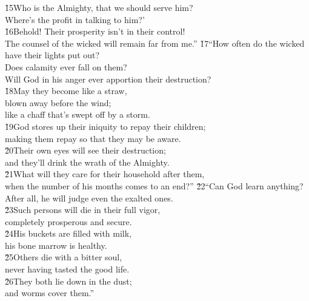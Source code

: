 \begin{poetry}
\poeml \v{15}Who is the Almighty, that we should serve him? \\
\poemll    Where's the profit in talking to him?' \\
\poeml \v{16}Behold! Their prosperity isn't in their control! \\
\poemll    The counsel of the wicked will remain far from me.''
\poeml \v{17}``How often do the wicked have their lights put out? \\
\poemll    Does calamity ever fall on them? \\
\poemlll       Will God in his anger ever apportion their destruction? \\
\poeml \v{18}May they become like a straw, \\
\poemll    blown away before the wind; \\
\poemlll       like a chaff that's swept off by a storm. \\
\poeml \v{19}God stores up their iniquity to repay their children; \\
\poemll    making them repay so that they may be aware. \\
\poeml \v{20}Their own eyes will see their destruction; \\
\poemll    and they'll drink the wrath of the Almighty. \\
\poeml \v{21}What will they care for their household after them, \\
\poemll    when the number of his months comes to an end?''
\poeml \v{22}``Can God learn anything? \\
\poemll    After all, he will judge even the exalted ones. \\
\poeml \v{23}Such persons will die in their full vigor, \\
\poemll    completely prosperous and secure. \\
\poeml \v{24}His buckets are filled with milk, \\
\poemll    his bone marrow is healthy. \\
\poeml \v{25}Others die with a bitter soul, \\
\poemll    never having tasted the good life. \\
\poeml \v{26}They both lie down in the dust; \\
\poemll    and worms cover them.''

\end{poetry}
